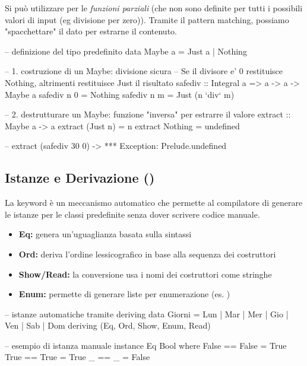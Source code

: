 Si può utilizzare per le \textit{funzioni parziali} (che non sono definite per tutti i possibili valori di input (eg divisione per zero)). Tramite il pattern matching, possiamo "spacchettare" il dato per estrarne il contenuto.

\begin{haskellbox}{}
-- definizione del tipo predefinito
data Maybe a = Just a | Nothing

-- 1. costruzione di un Maybe: divisione sicura
-- Se il divisore e' 0 restituisce Nothing, altrimenti restituisce Just il risultato
safediv :: Integral a => a -> a -> Maybe a
safediv n 0 = Nothing
safediv n m = Just (n `div` m)

-- 2. destrutturare un Maybe: funzione "inversa" per estrarre il valore
extract :: Maybe a -> a
extract (Just n) = n
extract Nothing  = undefined 

-- extract (safediv 30 0) -> *** Exception: Prelude.undefined 
\end{haskellbox}

\subsection{Istanze e Derivazione ()}
La keyword  è un meccanismo automatico che permette al compilatore di generare le istanze per le classi predefinite senza dover scrivere codice manuale. 

\begin{itemize}
    \item \textbf{Eq:} genera un'uguaglianza basata sulla sintassi
    \item \textbf{Ord:} deriva l'ordine lessicografico in base alla sequenza dei costruttori
    \item \textbf{Show/Read:} la conversione usa i nomi dei costruttori come stringhe
    \item \textbf{Enum:} permette di generare liste per enumerazione (es. )
\end{itemize}

\begin{haskellbox}{}
-- istanze automatiche tramite deriving 
data Giorni = Lun | Mar | Mer | Gio | Ven | Sab | Dom
    deriving (Eq, Ord, Show, Enum, Read)

-- esempio di istanza manuale 
instance Eq Bool where
    False == False = True
    True == True   = True
    _ == _         = False
\end{haskellbox}


